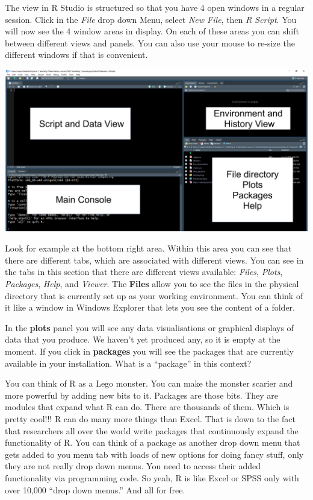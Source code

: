 \documentclass[]{book}
\theoremstyle{definition}
\theoremstyle{definition}
\theoremstyle{definition}
\theoremstyle{remark}
\begin{document}
The view in R Studio is structured so that you have 4 open windows in a
regular session. Click in the \emph{File} drop down Menu, select
\emph{New File}, then \emph{R Script}. You will now see the 4 window
areas in display. On each of these areas you can shift between different
views and panels. You can also use your mouse to re-size the different
windows if that is convenient.

\includegraphics{imgs/the4views.png}

Look for example at the bottom right area. Within this area you can see
that there are different tabs, which are associated with different
views. You can see in the tabs in this section that there are different
views available: \emph{Files}, \emph{Plots}, \emph{Packages},
\emph{Help}, and \emph{Viewer}. The \textbf{Files} allow you to see the
files in the physical directory that is currently set up as your working
environment. You can think of it like a window in Windows Explorer that
lets you see the content of a folder.

In the \textbf{plots} panel you will see any data visualisations or
graphical displays of data that you produce. We haven't yet produced
any, so it is empty at the moment. If you click in \textbf{packages} you
will see the packages that are currently available in your installation.
What is a ``package'' in this context?

You can think of R as a Lego monster. You can make the monster scarier
and more powerful by adding new bits to it. Packages are those bits.
They are modules that expand what R can do. There are thousands of them.
Which is pretty cool!!! R can do many more things than Excel. That is
down to the fact that researchers all over the world write packages that
continuously expand the functionality of R. You can think of a package
as another drop down menu that gets added to you menu tab with loads of
new options for doing fancy stuff, only they are not really drop down
menus. You need to access their added functionality via programming
code. So yeah, R is like Excel or SPSS only with over 10,000 ``drop down
menus.'' And all for free.
\end{document}
